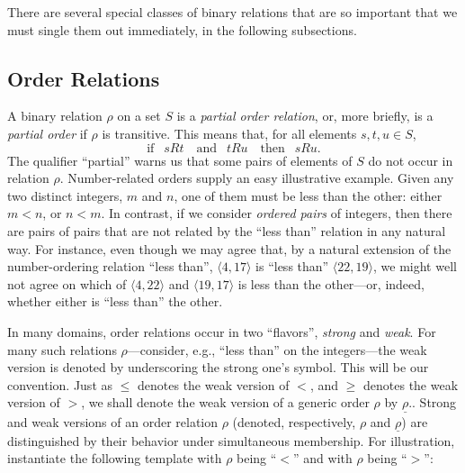 There are several special classes of binary relations that are so
important that we must single them out immediately, in the following
subsections.


\subsection{Order Relations}
\label{sec:order-relation}

A binary relation $\rho$ on a set $S$ is a {\it partial order
  relation}, or, more briefly, is a
{\it partial order} if $\rho$ is transitive. This means that, for all elements $s, t, u \in S$,
\begin{equation}
\label{eq:def-transitive}
\mbox{if } \ \ sRt \ \ \ \mbox{ and } \ \ tRu \ \ \ \mbox{ then }
\  \ sRu.
\end{equation}
The qualifier ``partial'' warns us that some pairs of elements of $S$
do not occur in relation $\rho$.  Number-related orders supply an easy
illustrative example.  Given any two distinct integers, $m$ and $n$,
one of them must be less than the other: either $m < n$, or $n < m$.
In contrast, if we consider {\it ordered pairs} of integers, then
there are pairs of pairs that are not related by the ``less than''
relation in any natural way.  For instance, even though we may agree
that, by a natural extension of the number-ordering relation ``less
than'', $\langle 4, 17 \rangle$ is ``less than'' $\langle 22, 19
\rangle$, we might well not agree on which of $\langle 4, 22 \rangle$
and $\langle 19, 17 \rangle$ is less than the other---or, indeed,
whether either is ``less than'' the other.

In many domains, order relations occur in two ``flavors'', {\em
  strong} and {\em weak}. For
many such relations $\rho$---consider, e.g., ``less than'' on the
integers---the weak version is denoted by underscoring the strong
one's symbol.  This will be our convention.  Just as $\leq$ denotes
the weak version of $<$, and $\geq$ denotes the weak version of $>$,
we shall denote the weak version of a generic order $\rho$ by
$\underline{\rho}$..  Strong and weak versions of an order relation
$\rho$ (denoted, respectively, $\rho$ and $\underline{\rho}$) are
distinguished by their behavior under simultaneous membership.  For
illustration, instantiate the following template with $\rho$ being
``$<$'' and with $\rho$ being ``$>$'':

